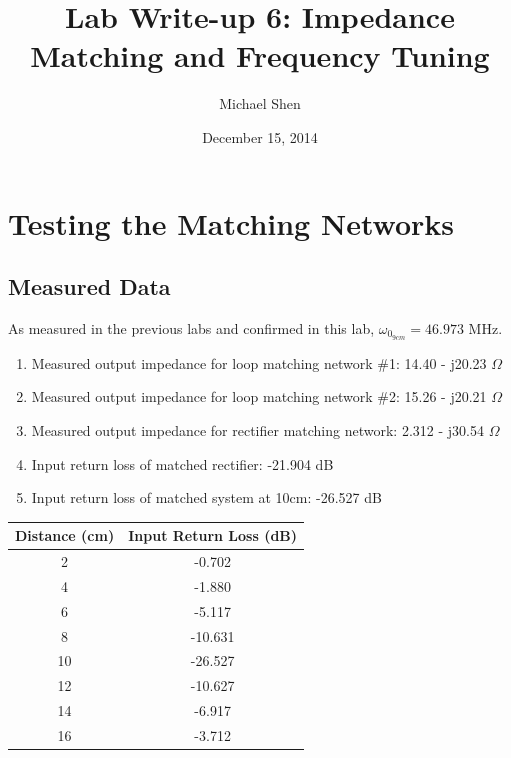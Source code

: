 \documentclass{article}
\begin{document}
\title{Lab Write-up 6: Impedance Matching and Frequency Tuning}
\author{Michael Shen}
\date{December 15, 2014}
\maketitle


\section{Testing the Matching Networks}

\subsection{Measured Data}
As measured in the previous labs and confirmed in this lab, $\omega_{0_{9cm}} = 46.973$ MHz.

\begin{enumerate}
	\item Measured output impedance for loop matching network \#1: 14.40 - j20.23 $\Omega$
	\item Measured output impedance for loop matching network \#2: 15.26 - j20.21 $\Omega$
	\item Measured output impedance for rectifier matching network: 2.312 - j30.54 $\Omega$
	\item Input return loss of matched rectifier: -21.904 dB
	\item Input return loss of matched system at 10cm: -26.527 dB
\end{enumerate}

\begin{table}[H]
\centering
\begin{tabular}{|c|c|}
\hline
Distance (cm) & Input Return Loss (dB) \\ \hline
2             & -0.702                 \\ \hline
4             & -1.880                 \\ \hline
6             & -5.117                 \\ \hline
8             & -10.631                \\ \hline
10            & -26.527                \\ \hline
12            & -10.627                \\ \hline
14            & -6.917                 \\ \hline
16            & -3.712                 \\ \hline
\end{tabular}
\end{table}
\end{document}
